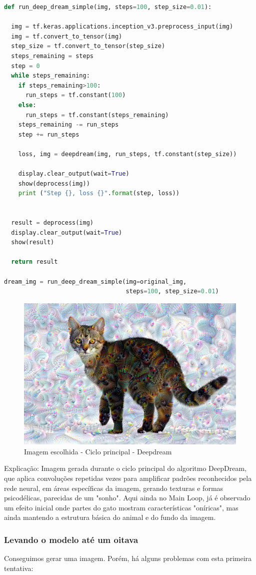 \begin{lstlisting}[language=Python, style=input]
def run_deep_dream_simple(img, steps=100, step_size=0.01):

  img = tf.keras.applications.inception_v3.preprocess_input(img)
  img = tf.convert_to_tensor(img)
  step_size = tf.convert_to_tensor(step_size)
  steps_remaining = steps
  step = 0
  while steps_remaining:
    if steps_remaining>100:
      run_steps = tf.constant(100)
    else:
      run_steps = tf.constant(steps_remaining)
    steps_remaining -= run_steps
    step += run_steps

    loss, img = deepdream(img, run_steps, tf.constant(step_size))

    display.clear_output(wait=True)
    show(deprocess(img))
    print ("Step {}, loss {}".format(step, loss))


  result = deprocess(img)
  display.clear_output(wait=True)
  show(result)

  return result

dream_img = run_deep_dream_simple(img=original_img,
                                  steps=100, step_size=0.01)
\end{lstlisting}
\begin{figure}[H]
\centering
\includegraphics[width=.8\linewidth]{apendices/fig/13_IAA012_12.png}
\caption{Imagem escolhida - Ciclo principal - Deepdream}
\end{figure}
Explicação: Imagem gerada durante o ciclo principal do algoritmo DeepDream, que aplica convoluções repetidas vezes para amplificar padrões reconhecidos pela rede neural, em áreas específicas da imagem, gerando texturas e formas psicodélicas, parecidas de um "sonho". Aqui ainda no Main Loop, já é observado um efeito inicial onde partes do gato mostram características "oníricas", mas ainda mantendo a estrutura básica do animal e do fundo da imagem.
\subsubsection*{Levando o modelo até um oitava}
Conseguimos gerar uma imagem. Porém, há alguns problemas com esta primeira tentativa:


